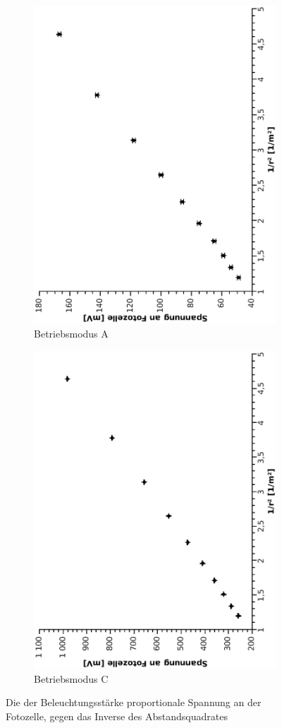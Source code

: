 \documentclass[12pt]{article}
\begin{document}

\begin{figure}
\centering
\begin{subfigure}{0.48\linewidth}
\includegraphics[width=0.75\linewidth, angle=-90]{niedrigetemp.eps}
\caption{ \label{figLowTemp} Betriebsmodus A}
\end{subfigure}
\begin{subfigure}{0.48\linewidth}
\includegraphics[width=0.75\linewidth, angle=-90]{hohetemp.eps}
\caption{Betriebsmodus \label{figHighTemp} C}
\end{subfigure}
\caption{Die der Beleuchtungsstärke proportionale Spannung an der Fotozelle, gegen das Inverse des Abstandsquadrates}
\end{figure}
\end{document}
